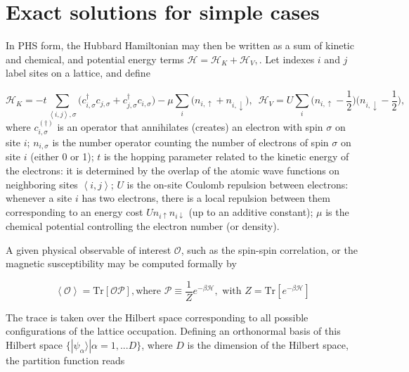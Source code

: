 \section{Exact solutions for simple cases}\label{sec:exactSolutions}

In \ac{PHS} form, the Hubbard Hamiltonian may then be written as a sum of kinetic and chemical, and potential energy terms 
$
\mathcal{H} = \mathcal{H}_K + \mathcal{H}_V ,
$.
Let indexes $i$ and $j$ label sites on a lattice, and define

\begin{equation}\label{eq:def_energies}
\mathcal{H}_K = -t \sum_{\left\langle i, j \right \rangle, \sigma} \bigg( c_{i,\sigma}^\dagger c_{j,\sigma} + c_{j,\sigma}^\dagger c_{i,\sigma} \bigg) -\mu \sum_i \bigg( n_{i,\uparrow} + n_{i,\downarrow} \bigg) , \,\,\,
\mathcal{H}_V = U \sum_{i} \bigg( n_{i,\uparrow} - \frac{1}{2} \bigg) \bigg( n_{i,\downarrow} - \frac{1}{2} \bigg) ,
\end{equation}
where $c_{i,\sigma}^{(\dagger)}$ is an operator that annihilates (creates) an electron with spin $\sigma$ on site $i$; $n_{i,\sigma}$ is the number operator counting the number of electrons of spin $\sigma$ on site $i$ (either 0 or 1); $t$ is the hopping parameter related to the kinetic energy of the electrons: it is determined by the overlap of the atomic wave functions on neighboring sites $\left\langle i, j \right\rangle$; $U$ is the on-site Coulomb repulsion between electrons: whenever a site $i$ has two electrons, there is a local repulsion between them corresponding to an energy cost $U n_{i \uparrow} n_{i \downarrow}$ (up to an additive constant); $\mu$ is the chemical potential controlling the electron number (or density).

A given physical observable of interest $\mathcal{O}$, such as the spin-spin correlation, or the magnetic susceptibility may be computed formally by

\begin{equation}\label{eq:projection}
\left\langle \mathcal{O} \right\rangle = \text{Tr} [ \mathcal{O} \mathcal{P} ] , \text{where
} \,\, \mathcal{P} \equiv \frac{1}{Z} e^{-\beta \mathcal{H} } , \text{ with } Z = \text{Tr} [ e^{-\beta \mathcal{H} } ]
\end{equation}

The trace is taken over the Hilbert space corresponding to all possible configurations of the lattice occupation.
Defining an orthonormal basis of this Hilbert space $\{ | \psi_\alpha \rangle | \alpha = 1, ... D \} $, where $D$ is the dimension of the Hilbert space, the partition function reads

